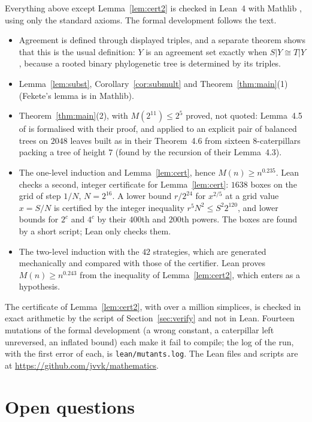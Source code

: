 \documentclass[11pt]{amsart}
\theoremstyle{definition}
\begin{document}
Everything above except Lemma~\ref{lem:cert2} is checked in Lean~4 with Mathlib
\cite{mathlib}, using only the standard axioms. The formal development follows the text.
\begin{itemize}
\item Agreement is defined through displayed triples, and a separate theorem shows that this is the
  usual definition: $Y$ is an agreement set exactly when $S|Y\cong T|Y$, because a rooted binary
  phylogenetic tree is determined by its triples.
\item Lemma~\ref{lem:subst}, Corollary~\ref{cor:submult} and Theorem~\ref{thm:main}(1) (Fekete's
  lemma is in Mathlib).
\item Theorem~\ref{thm:main}(2), with $M(2^{11})\le 2^5$ proved, not quoted: Lemma~4.5 of
  \cite{BLOSSW} is formalised with their proof, and applied to an explicit pair of balanced trees on
  $2048$ leaves built as in their Theorem~4.6 from sixteen $8$-caterpillars packing a tree of height $7$
  (found by the recursion of their Lemma~4.3).
\item The one-level induction and Lemma~\ref{lem:cert}, hence $M(n)\ge n^{0.235}$. Lean checks a second,
  integer certificate for Lemma~\ref{lem:cert}: $1638$ boxes on the grid of step $1/N$, $N=2^{16}$.
  A lower bound $r/2^{24}$ for $x^{2/5}$ at a grid value $x=S/N$ is certified by the integer inequality
  $r^5N^2\le S^2 2^{120}$, and lower bounds for $2^c$ and $4^c$ by their $400$th and $200$th powers. The boxes are found by a short script; Lean only checks them.
\item The two-level induction with the $42$ strategies, which are generated mechanically and compared
  with those of the certifier. Lean proves $M(n)\ge n^{0.243}$ from the inequality of
  Lemma~\ref{lem:cert2}, which enters as a hypothesis.
\end{itemize}
The certificate of Lemma~\ref{lem:cert2}, with over a million simplices, is checked in exact arithmetic by
the script of Section~\ref{sec:verify} and not in Lean. Fourteen mutations of the formal development
(a wrong constant, a caterpillar left unreversed, an inflated bound) each make it fail to compile;
the log of the run, with the first error of each, is \texttt{lean/mutants.log}. The Lean files
and scripts are at \url{https://github.com/jvvk/mathematics}.

\section{Open questions}
\end{document}
